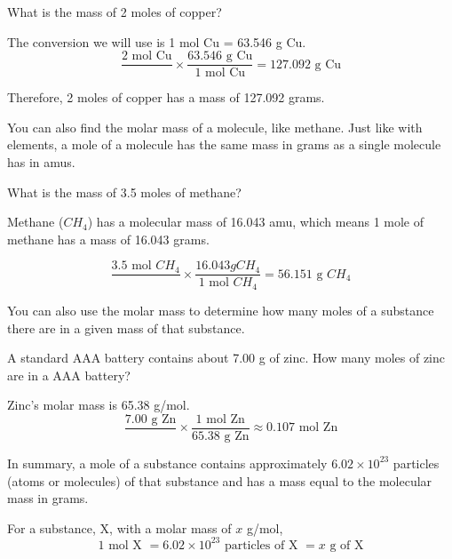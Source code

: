 \begin{Worked}
\begin{Problem}
What is the mass of 2 moles of copper?
\end{Problem}
\begin{Solution}
The conversion we will use is 1 mol Cu = 63.546 g Cu.
$$\frac{2 \text{ mol Cu}}{} \times \frac{63.546\text{ g Cu}}{1\text{ mol Cu}} = 
127.092\text{ g Cu}$$

Therefore, 2 moles of copper has a mass of 127.092 grams. 
\end{Solution}
\end{Worked}

You can also find the molar mass of a molecule, like methane. Just like with 
elements, a mole of a molecule has the same mass in grams as a single molecule has
in amus. 

\begin{Worked}
\begin{Problem}
What is the mass of 3.5 moles of methane?
\end{Problem}
\begin{Solution}
Methane ($CH_4$) has a molecular mass of 16.043 amu, which 
means 1 mole of methane has a mass of 16.043 grams. 

$$\frac{3.5\text{ mol }CH_4}{} \times \frac{16.043{ g }CH_4}{1\text{ mol }CH_4} = 
56.151\text{ g }CH_4$$
\end{Solution}
\end{Worked}

You can also use the molar mass to determine how many moles of a substance there 
are in a given mass of that substance.

\begin{Worked}
\begin{Problem}
A standard AAA battery contains about 7.00 g of zinc. How many 
moles of zinc are in a AAA battery?
\end{Problem}
\begin{Solution}
Zinc's molar mass is 65.38 g/mol. 
$$\frac{7.00\text{ g Zn}}{} \times \frac{1\text{ mol Zn}}{65.38\text{ g Zn}} 
\approx 0.107\text{ mol Zn}$$
\end{Solution}
\end{Worked}

In summary, a mole of a substance contains approximately $6.02 \times 10^{23}$ 
particles (atoms or molecules) of that substance and has a mass equal to the 
molecular mass in grams. 

\begin{mdframed}[frametitle = {The Mole Concept}, style = important]
For a substance, X, with a molar mass of $x$ g/mol,
$$1\text{ mol X } = 6.02 \times 10^{23}\text{ particles of X }= x\text{ g of X}$$
\end{mdframed}


